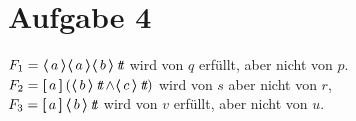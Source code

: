 \section*{Aufgabe 4}

$F_1 = \poss{a} \poss{a} \poss{b} \true$ wird von $q$ erfüllt, aber nicht von $p$.\\
$F_2 = \necess{a} (\poss{b} \true \land \poss{c} \true)$ wird von $s$ aber nicht von $r$,\\
$F_3 = \necess{a} \poss{b} \true$ wird von $v$ erfüllt, aber nicht von $u$.

